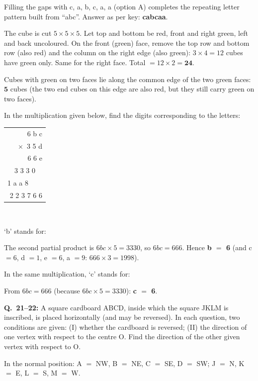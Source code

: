 Filling the gaps with c, a, b, c, a, a (option A) completes the repeating letter pattern built from ``abc''. Answer as per key: \textbf{cabcaa}.

The cube is cut $5\times5\times5$. Let top and bottom be red, front and right green, left and back uncoloured.
On the front (green) face, remove the top row and bottom row (also red) and the column on the right edge (also green): $3\times4=12$ cubes have green only. Same for the right face.
Total $=12\times2=\mathbf{24}$.

Cubes with green on two faces lie along the common edge of the two green faces: $\mathbf{5}$ cubes (the two end cubes on this edge are also red, but they still carry green on two faces).

In the multiplication given below, find the digits corresponding to the letters:\\[3pt]
\centering\begin{tabular}{r} 6 b c\\ $\times$\ 3 5 d\\\hline 6 6 e\\ 3 3 3 0\ \ \\ 1 a a 8\ \ \ \ \\\hline 2 2 3 7 6 6\end{tabular}\\[3pt]
\raggedright `b' stands for:

The second partial product is $6bc\times5=3330$, so $6bc=666$. Hence \textbf{b $=$ 6} (and c $=6$, d $=1$, e $=6$, a $=9$: $666\times3=1998$).

In the same multiplication, `c' stands for:

From $6bc=666$ (because $6bc\times5=3330$): \textbf{c $=$ 6}.

\textbf{Q.~21--22:} A square cardboard ABCD, inside which the square JKLM is inscribed, is placed horizontally (and may be reversed). In each question, two conditions are given: (I) whether the cardboard is reversed; (II) the direction of one vertex with respect to the centre O. Find the direction of the other given vertex with respect to O.
\begin{center}
\end{center}
In the normal position: A $=$ NW, B $=$ NE, C $=$ SE, D $=$ SW; J $=$ N, K $=$ E, L $=$ S, M $=$ W.

